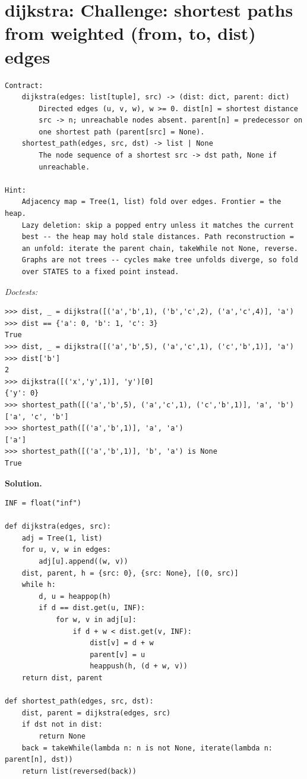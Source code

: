 \documentclass[11pt,letterpaper]{book}
\begin{document}
\section{dijkstra: Challenge: shortest paths from weighted (from, to, dist) edges}
\begin{lstlisting}[style=spec]
Contract:
    dijkstra(edges: list[tuple], src) -> (dist: dict, parent: dict)
        Directed edges (u, v, w), w >= 0. dist[n] = shortest distance
        src -> n; unreachable nodes absent. parent[n] = predecessor on
        one shortest path (parent[src] = None).
    shortest_path(edges, src, dst) -> list | None
        The node sequence of a shortest src -> dst path, None if
        unreachable.

Hint:
    Adjacency map = Tree(1, list) fold over edges. Frontier = the heap.
    Lazy deletion: skip a popped entry unless it matches the current
    best -- the heap may hold stale distances. Path reconstruction =
    an unfold: iterate the parent chain, takeWhile not None, reverse.
    Graphs are not trees -- cycles make tree unfolds diverge, so fold
    over STATES to a fixed point instead.
\end{lstlisting}
\noindent\textit{Doctests:}
\begin{lstlisting}[style=spec]
>>> dist, _ = dijkstra([('a','b',1), ('b','c',2), ('a','c',4)], 'a')
>>> dist == {'a': 0, 'b': 1, 'c': 3}
True
>>> dist, _ = dijkstra([('a','b',5), ('a','c',1), ('c','b',1)], 'a')
>>> dist['b']
2
>>> dijkstra([('x','y',1)], 'y')[0]
{'y': 0}
>>> shortest_path([('a','b',5), ('a','c',1), ('c','b',1)], 'a', 'b')
['a', 'c', 'b']
>>> shortest_path([('a','b',1)], 'a', 'a')
['a']
>>> shortest_path([('a','b',1)], 'b', 'a') is None
True
\end{lstlisting}
\noindent\textbf{Solution.}
\begin{lstlisting}[style=code]
INF = float("inf")

def dijkstra(edges, src):
    adj = Tree(1, list)
    for u, v, w in edges:
        adj[u].append((w, v))
    dist, parent, h = {src: 0}, {src: None}, [(0, src)]
    while h:
        d, u = heappop(h)
        if d == dist.get(u, INF):
            for w, v in adj[u]:
                if d + w < dist.get(v, INF):
                    dist[v] = d + w
                    parent[v] = u
                    heappush(h, (d + w, v))
    return dist, parent

def shortest_path(edges, src, dst):
    dist, parent = dijkstra(edges, src)
    if dst not in dist:
        return None
    back = takeWhile(lambda n: n is not None, iterate(lambda n: parent[n], dst))
    return list(reversed(back))
\end{lstlisting}
\end{document}
